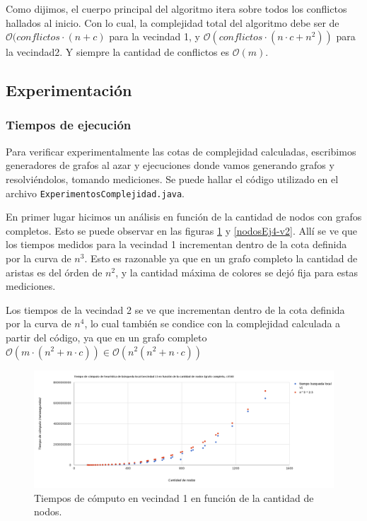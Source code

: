 Como dijimos, el cuerpo principal del algoritmo itera sobre todos los conflictos hallados al inicio. Con lo cual, la complejidad total del algoritmo debe ser de $\mathcal{O}(conflictos \cdot (n+c)$ para la vecindad 1, y $\mathcal{O}(conflictos \cdot (n \cdot c + n^2))$ para la vecindad2. Y siempre la cantidad de conflictos es $\mathcal{O}(m)$.

\subsection{Experimentación}

\subsubsection{Tiempos de ejecución}

Para verificar experimentalmente las cotas de complejidad calculadas, escribimos generadores de grafos al azar y ejecuciones donde vamos generando grafos y resolviéndolos, tomando mediciones. Se puede hallar el código utilizado en el archivo \texttt{ExperimentosComplejidad.java}.

En primer lugar hicimos un análisis en función de la cantidad de nodos con grafos completos. Esto se puede observar en las figuras \ref{nodosEj4-v1} y \ref{nodosEj4-v2}. Allí se ve que los tiempos medidos para la vecindad 1 incrementan dentro de la cota definida por la curva de $n^3$. Esto es razonable ya que en un grafo completo la cantidad de aristas es del órden de $n^2$, y la cantidad máxima de colores se dejó fija para estas mediciones.

Los tiempos de la vecindad 2 se ve que incrementan dentro de la cota definida por la curva de $n^4$, lo cual también se condice con la complejidad calculada a partir del código, ya que en un grafo completo $\mathcal{O}(m \cdot (n^2 + n \cdot c)) \in \mathcal{O}(n^2 (n^2 + n \cdot c))$

\begin{figure}[H]
	\centering
 	\includegraphics[width=18cm]{imagenes/Ej4/TvsNodosV1.png}
	\caption{Tiempos de cómputo en vecindad 1 en función de la cantidad de nodos.}
	\label{nodosEj4-v1}
 \end{figure}
 
